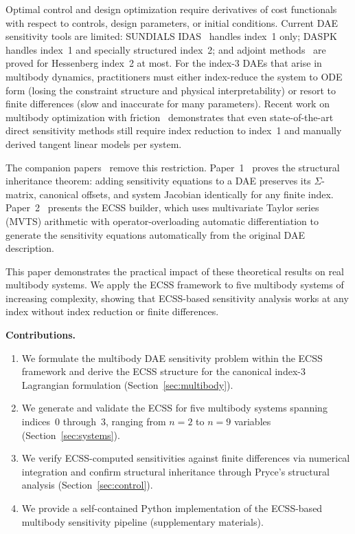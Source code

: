 \documentclass[12pt,a4paper]{article}
\theoremstyle{definition}
\theoremstyle{plain}
\begin{document}
Optimal control and design optimization require derivatives of cost functionals with respect to controls, design parameters, or initial conditions. Current DAE sensitivity tools are limited: SUNDIALS IDAS~\cite{gardner2022sundials} handles index~1 only; DASPK~\cite{li2000sensitivity} handles index~1 and specially structured index~2; and adjoint methods~\cite{cao2002adjoint,cao2003adjoint} are proved for Hessenberg index~2 at most. For the index-3 DAEs that arise in multibody dynamics, practitioners must either index-reduce the system to ODE form (losing the constraint structure and physical interpretability) or resort to finite differences (slow and inaccurate for many parameters). Recent work on multibody optimization with friction~\cite{verulkar2024simultaneous} demonstrates that even state-of-the-art direct sensitivity methods still require index reduction to index~1 and manually derived tangent linear models per system.

The companion papers~\cite{cao2026structural,cao2026builder} remove this restriction. Paper~1~\cite{cao2026structural} proves the structural inheritance theorem: adding sensitivity equations to a DAE preserves its $\Sigma$-matrix, canonical offsets, and system Jacobian identically for any finite index. Paper~2~\cite{cao2026builder} presents the ECSS builder, which uses multivariate Taylor series (MVTS) arithmetic with operator-overloading automatic differentiation to generate the sensitivity equations automatically from the original DAE description.

This paper demonstrates the practical impact of these theoretical results on real multibody systems. We apply the ECSS framework to five multibody systems of increasing complexity, showing that ECSS-based sensitivity analysis works at any index without index reduction or finite differences.

\medskip\noindent\textbf{Contributions.}
\begin{enumerate}[nosep]
  \item We formulate the multibody DAE sensitivity problem within the ECSS framework and derive the ECSS structure for the canonical index-3 Lagrangian formulation (Section~\ref{sec:multibody}).
  \item We generate and validate the ECSS for five multibody systems spanning indices~0 through~3, ranging from $n=2$ to $n=9$ variables (Section~\ref{sec:systems}).
  \item We verify ECSS-computed sensitivities against finite differences via numerical integration and confirm structural inheritance through Pryce's structural analysis (Section~\ref{sec:control}).
  \item We provide a self-contained Python implementation of the ECSS-based multibody sensitivity pipeline (supplementary materials).
\end{enumerate}
\end{document}
